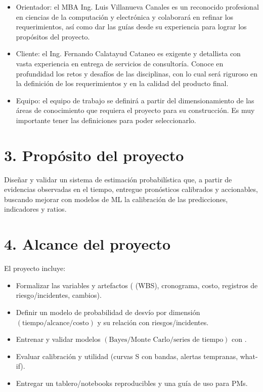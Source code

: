 \documentclass[12pt]
{charter}
\begin{document}
\FloatBarrier

\begin{itemize}
	\item Orientador: el MBA Ing. Luis Villanueva Canales es un reconocido profesional en ciencias de la computación y electrónica y colaborará en refinar los requerimientos, así como dar las guías desde su experiencia para lograr los propósitos del proyecto.
	\item Cliente: el Ing. Fernando Calatayud Cataneo es exigente y detallista con vasta experiencia en entrega de servicios de consultoría. Conoce en profundidad los retos y desafíos de las disciplinas, con lo cual será riguroso en la definición de los requerimientos y en la calidad del producto final.
	\item Equipo: el equipo de trabajo se definirá a partir del dimensionamiento de las áreas de conocimiento que requiera el proyecto para su construcción. Es muy importante tener las definiciones para poder seleccionarlo.
\end{itemize}


\section{3. Propósito del proyecto}
\label{sec:proposito}

Diseñar y validar un sistema de estimación probabilística que, a partir de evidencias observadas en el tiempo, entregue pronósticos calibrados y accionables, buscando mejorar con modelos de ML la calibración de las predicciones, indicadores y ratios.

\section{4. Alcance del proyecto}
\label{sec:alcance}

El proyecto incluye:
\begin{itemize}
	\item Formalizar las variables y artefactos ( (WBS), cronograma, costo, registros de riesgo/incidentes, cambios).
	\item Definir un modelo de probabilidad de desvío por dimensión $(\text{tiempo} / \text{alcance} / \text{costo})$ y su relación con riesgos/incidentes.
	\item Entrenar y validar modelos $(\text{Bayes} / \text{Monte Carlo} / \text{series de tiempo})$ con .
	\item Evaluar calibración y utilidad (curvas S con bandas, alertas tempranas, what-if).
	\item Entregar un tablero/notebooks reproducibles y una guía de uso para PMs. 
\end{itemize}
\end{document}

